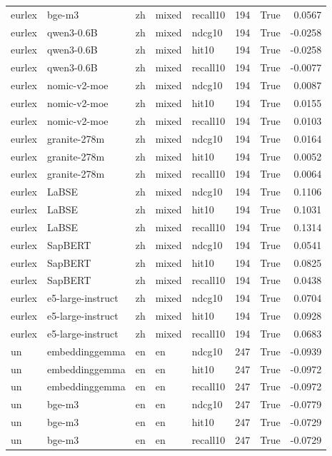 \begin{tabular}{lllllrrr}
eurlex & bge-m3 & zh & mixed & recall10 & 194 & True & 0.0567 \\
eurlex & qwen3-0.6B & zh & mixed & ndcg10 & 194 & True & -0.0258 \\
eurlex & qwen3-0.6B & zh & mixed & hit10 & 194 & True & -0.0258 \\
eurlex & qwen3-0.6B & zh & mixed & recall10 & 194 & True & -0.0077 \\
eurlex & nomic-v2-moe & zh & mixed & ndcg10 & 194 & True & 0.0087 \\
eurlex & nomic-v2-moe & zh & mixed & hit10 & 194 & True & 0.0155 \\
eurlex & nomic-v2-moe & zh & mixed & recall10 & 194 & True & 0.0103 \\
eurlex & granite-278m & zh & mixed & ndcg10 & 194 & True & 0.0164 \\
eurlex & granite-278m & zh & mixed & hit10 & 194 & True & 0.0052 \\
eurlex & granite-278m & zh & mixed & recall10 & 194 & True & 0.0064 \\
eurlex & LaBSE & zh & mixed & ndcg10 & 194 & True & 0.1106 \\
eurlex & LaBSE & zh & mixed & hit10 & 194 & True & 0.1031 \\
eurlex & LaBSE & zh & mixed & recall10 & 194 & True & 0.1314 \\
eurlex & SapBERT & zh & mixed & ndcg10 & 194 & True & 0.0541 \\
eurlex & SapBERT & zh & mixed & hit10 & 194 & True & 0.0825 \\
eurlex & SapBERT & zh & mixed & recall10 & 194 & True & 0.0438 \\
eurlex & e5-large-instruct & zh & mixed & ndcg10 & 194 & True & 0.0704 \\
eurlex & e5-large-instruct & zh & mixed & hit10 & 194 & True & 0.0928 \\
eurlex & e5-large-instruct & zh & mixed & recall10 & 194 & True & 0.0683 \\
un & embeddinggemma & en & en & ndcg10 & 247 & True & -0.0939 \\
un & embeddinggemma & en & en & hit10 & 247 & True & -0.0972 \\
un & embeddinggemma & en & en & recall10 & 247 & True & -0.0972 \\
un & bge-m3 & en & en & ndcg10 & 247 & True & -0.0779 \\
un & bge-m3 & en & en & hit10 & 247 & True & -0.0729 \\
un & bge-m3 & en & en & recall10 & 247 & True & -0.0729 \\

\end{tabular}
